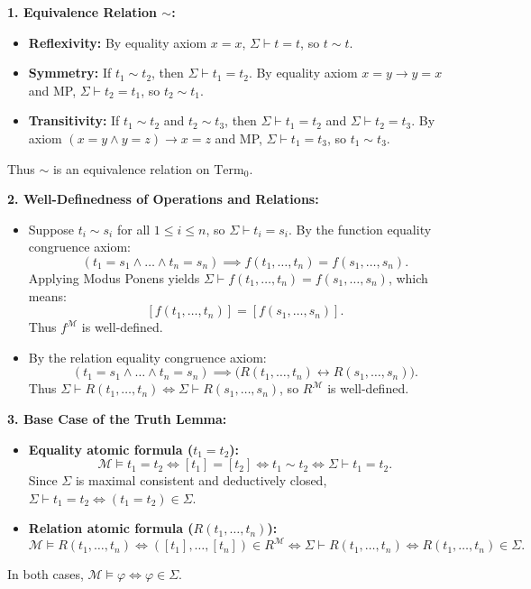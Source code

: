 \begin{tabletworkspace}[5.0cm]
\end{tabletworkspace}

\begin{solution}
\textbf{1. Equivalence Relation $\sim$:}
\begin{itemize}[leftmargin=1.4em,itemsep=2pt]
  \item \textbf{Reflexivity:} By equality axiom $x = x$, $\Sigma \vdash t = t$, so $t \sim t$.
  \item \textbf{Symmetry:} If $t_1 \sim t_2$, then $\Sigma \vdash t_1 = t_2$. By equality axiom $x = y \to y = x$ and MP, $\Sigma \vdash t_2 = t_1$, so $t_2 \sim t_1$.
  \item \textbf{Transitivity:} If $t_1 \sim t_2$ and $t_2 \sim t_3$, then $\Sigma \vdash t_1 = t_2$ and $\Sigma \vdash t_2 = t_3$.
  By axiom $(x = y \land y = z) \to x = z$ and MP, $\Sigma \vdash t_1 = t_3$, so $t_1 \sim t_3$.
\end{itemize}
Thus $\sim$ is an equivalence relation on $\mathrm{Term}_0$.

\textbf{2. Well-Definedness of Operations and Relations:}
\begin{itemize}[leftmargin=1.4em,itemsep=2pt]
  \item Suppose $t_i \sim s_i$ for all $1 \le i \le n$, so $\Sigma \vdash t_i = s_i$.
  By the function equality congruence axiom:
  \[
  (t_1 = s_1 \land \dots \land t_n = s_n) \implies f(t_1, \dots, t_n) = f(s_1, \dots, s_n).
  \]
  Applying Modus Ponens yields $\Sigma \vdash f(t_1, \dots, t_n) = f(s_1, \dots, s_n)$, which means:
  \[
  [f(t_1, \dots, t_n)] = [f(s_1, \dots, s_n)].
  \]
  Thus $f^\mathcal{M}$ is well-defined.
  \item By the relation equality congruence axiom:
  \[
  (t_1 = s_1 \land \dots \land t_n = s_n) \implies \bigl( R(t_1, \dots, t_n) \leftrightarrow R(s_1, \dots, s_n) \bigr).
  \]
  Thus $\Sigma \vdash R(t_1, \dots, t_n) \iff \Sigma \vdash R(s_1, \dots, s_n)$, so $R^\mathcal{M}$ is well-defined.
\end{itemize}

\textbf{3. Base Case of the Truth Lemma:}
\begin{itemize}[leftmargin=1.4em,itemsep=2pt]
  \item \textbf{Equality atomic formula ($t_1 = t_2$):}
  \[
  \mathcal{M} \models t_1 = t_2 \iff [t_1] = [t_2] \iff t_1 \sim t_2 \iff \Sigma \vdash t_1 = t_2.
  \]
  Since $\Sigma$ is maximal consistent and deductively closed, $\Sigma \vdash t_1 = t_2 \iff (t_1 = t_2) \in \Sigma$.
  \item \textbf{Relation atomic formula ($R(t_1, \dots, t_n)$):}
  \[
  \mathcal{M} \models R(t_1, \dots, t_n) \iff ([t_1], \dots, [t_n]) \in R^\mathcal{M} \iff \Sigma \vdash R(t_1, \dots, t_n) \iff R(t_1, \dots, t_n) \in \Sigma.
  \]
\end{itemize}
In both cases, $\mathcal{M} \models \varphi \iff \varphi \in \Sigma$.


\end{solution}
